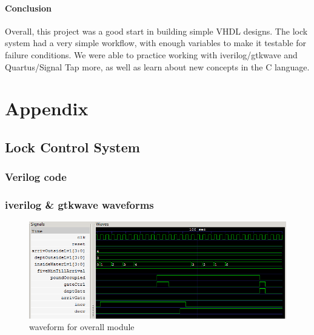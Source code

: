 \documentclass{article}
\begin{document}
  \paragraph{Conclusion} Overall, this project was a good start in building simple VHDL designs. The lock system had a very simple workflow, with enough variables to make it testable for failure conditions. We were able to practice working with iverilog/gtkwave and Quartus/Signal Tap more, as well as learn about new concepts in the C language.

\section{Appendix}
	\subsection{Lock Control System}
    \subsubsection{Verilog code}
      
      

      
      

      
      

      
      

      
      

    \subsubsection{iverilog \& gtkwave waveforms}
      \begin{figure} [H]
        \centering
        \includegraphics[width=0.75\linewidth]{figures/gtkwave/overall_gtk.png}
        \caption{waveform for overall module}
        \label{fig:overall_waveform}
      \end{figure}
\end{document}
